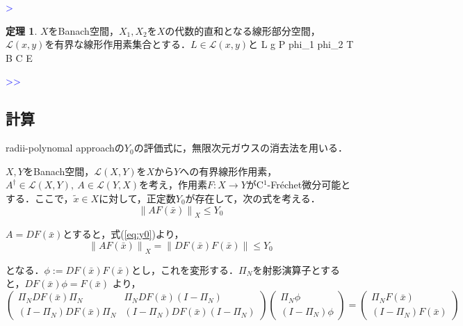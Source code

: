 \documentclass[11pt,a4paper]{jsarticle}
\theoremstyle{definition}
\newtheorem{thm}{定理}
\begin{document}
\textcolor{blue}{>}

\begin{thm}
  $X$をBanach空間，$X_1,X_2$を$X$の代数的直和となる線形部分空間，$\mathcal{L}(x,y)$を有界な線形作用素集合とする．$L\in\mathcal{L}(x,y)$と
  L g P phi_1 phi_2 T B C E
\end{thm}

\textcolor{blue}{>>}



\subsection{計算}
radii-polynomal approachの$Y_0$の評価式に，無限次元ガウスの消去法を用いる．

$X,Y$をBanach空間，$\mathcal{L}(X,Y)$を$X$から$Y$への有界線形作用素，$A^\dagger \in \mathcal{L}(X,Y),\ A \in \mathcal{L}(Y,X)$を考え，作用素$F:X \rightarrow Y$がC$^1$-Fr\'{e}chet微分可能とする．ここで，$\tilde{x}\in X$に対して，正定数$Y_0$が存在して，次の式を考える．
\begin{equation}
  \left\| AF(\bar{x}) \right\|_X \leq Y_0
  \label{eq:y0}
\end{equation}

$A=DF(\bar{x})$とすると，式(\ref{eq:y0})より，
\begin{equation}
  \left\| AF(\bar{x}) \right\|_X = \left\| DF(\bar{x}) F(\bar{x}) \right\| \leq Y_0
  \label{eq:y1}
\end{equation}

となる．$\phi:=DF(\bar{x}) F(\bar{x})$とし，これを変形する．$\Pi_N$を射影演算子とすると，$DF(\bar{x}) \phi = F(\bar{x})$  より，
\begin{equation}
    \begin{pmatrix}
      \Pi_N DF(\bar{x}) \Pi_N & \Pi_N DF(\bar{x}) (I-\Pi_N) \\
      (I-\Pi_N) DF(\bar{x}) \Pi_N & (I-\Pi_N) DF(\bar{x}) (I-\Pi_N)
    \end{pmatrix}
    \begin{pmatrix}
      \Pi_N \phi \\
      (I-\Pi_N) \phi
    \end{pmatrix}
    =
    \begin{pmatrix}
      \Pi_N F(\bar{x}) \\
      (I - \Pi_N) F(\bar{x})
    \end{pmatrix}
\end{equation}
\end{document}
